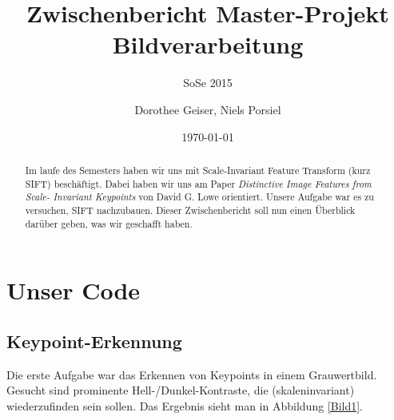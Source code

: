 \documentclass[a4paper,12pt]{scrartcl}
\title{Zwischenbericht Master-Projekt Bildverarbeitung}
\subtitle{SoSe 2015}
\author{Dorothee Geiser, Niels Porsiel}
\date{\today}
\begin{document}
\maketitle
\thispagestyle{empty}
\vspace{0.3\textheight}

\begin{abstract}
Im laufe des Semesters haben wir uns mit Scale-Invariant Feature Transform (kurz SIFT)
beschäftigt. Dabei haben wir uns am Paper \textit{Distinctive Image Features from Scale-
Invariant Keypoints} von David G. Lowe \cite{Lowe} orientiert. Unsere Aufgabe war es zu 
versuchen, SIFT nachzubauen. Dieser Zwischenbericht soll nun einen Überblick darüber geben,
was wir geschafft haben.
\end{abstract}

\newpage
\tableofcontents
\newpage

\section{Unser Code}
\subsection{Keypoint-Erkennung}
Die erste Aufgabe war das Erkennen von Keypoints in einem Grauwertbild. Gesucht sind 
prominente Hell-/Dunkel-Kontraste, die (skaleninvariant) wiederzufinden sein sollen. 
Das Ergebnis sieht man in Abbildung \ref{Bild1}.
\end{document}
